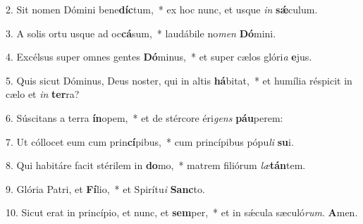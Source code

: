 2. Sit nomen Dómini bene\textbf{díc}tum,~* ex hoc nunc, et usque \textit{in} \textbf{sǽ}culum.

3. A solis ortu usque ad oc\textbf{cá}sum,~* laudábile no\textit{men} \textbf{Dó}mini.

4. Excélsus super omnes gentes \textbf{Dó}minus,~* et super cælos glóri\textit{a} \textbf{e}jus.

5. Quis sicut Dóminus, Deus noster, qui in altis \textbf{há}bitat,~* et humília réspicit in cælo et \textit{in} \textbf{ter}ra?

6. Súscitans a terra \textbf{ín}opem,~* et de stércore éri\textit{gens} \textbf{páu}perem:

7. Ut cóllocet eum cum prin\textbf{cí}pibus,~* cum princípibus pópu\textit{li} \textbf{su}i.

8. Qui habitáre facit stérilem in \textbf{do}mo,~* matrem filiórum \textit{læ}\textbf{tán}tem.

9. Glória Patri, et \textbf{Fí}lio,~* et Spirítu\textit{i} \textbf{Sanc}to.

10. Sicut erat in princípio, et nunc, et \textbf{sem}per,~* et in sǽcula sæculó\textit{rum}. \textbf{A}men.